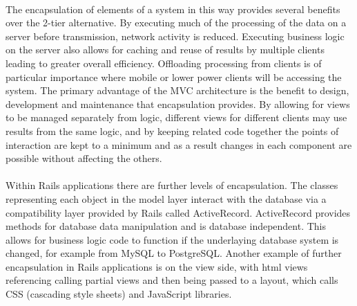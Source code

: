 \documentclass[letterpaper]{amsart}
\begin{document}
\paragraph{ }
The encapsulation of elements of a system in this way provides several benefits over the 2-tier alternative.  By executing much of the processing of the data on a server before transmission, network activity is reduced.  Executing business logic on the server also allows for caching and reuse of results by multiple clients leading to greater overall efficiency.  Offloading processing from clients is of particular importance where mobile or lower power clients will be accessing the system.  The primary advantage of the MVC architecture is the benefit to design, development and maintenance that encapsulation provides.  By allowing for views to be managed separately from logic, different views for different clients may use results from the same logic, and by keeping related code together the points of interaction are kept to a minimum and as a result changes in each component are possible without affecting the others.\cite{unobajax}
\paragraph{ }  Within Rails applications there are further levels of encapsulation.  The classes representing each object in the model layer interact with the database via a compatibility layer provided by Rails called ActiveRecord.  ActiveRecord provides methods for database data manipulation and is database independent.  This allows for business logic code to function if the underlaying database system is changed, for example from MySQL to PostgreSQL.  Another example of further encapsulation in Rails applications is on the view side, with html views referencing calling partial views and then being passed to a layout, which calls CSS (cascading style sheets) and JavaScript libraries.
\end{document}
